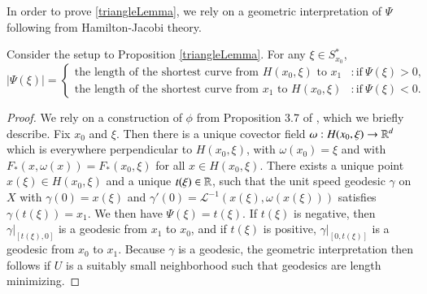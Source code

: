 

In order to prove \ref{triangleLemma}, we rely on a geometric interpretation of $\Psi$ following from Hamilton-Jacobi theory.

\begin{lemma} \label{HamiltonLemma}
    Consider the setup to Proposition \ref{triangleLemma}. For any $\xi \in S\!_{x_0}^*$,
    \[ |\Psi(\xi)| = \begin{cases} \text{the length of the shortest curve from $H(x_0,\xi)$ to $x_1$} & : \text{if}\ \Psi(\xi) > 0, \\ \text{the length of the shortest curve from $x_1$ to $H(x_0,\xi)$} & : \text{if}\ \Psi(\xi) < 0. \end{cases} \]
\end{lemma}
\begin{proof}
    We rely on a construction of $\phi$ from Proposition 3.7 of \cite{Treves2}, which we briefly describe. Fix $x_0$ and $\xi$. Then there is a unique covector field $\omega: H(x_0,\xi) \to \operatorname{\mathbb{R}}^d$ which is everywhere perpendicular to $H(x_0,\xi)$, with $\omega(x_0) = \xi$ and with $F_*(x,\omega(x)) = F_*(x_0,\xi)$ for all $x \in H(x_0,\xi)$. There exists a unique point $x(\xi) \in H(x_0,\xi)$ and a unique $t(\xi) \in \operatorname{\mathbb{R}}$, such that the unit speed geodesic $\gamma$ on $X$ with $\gamma(0) = x(\xi)$ and $\gamma'(0) = \mathcal{L}^{-1}( x(\xi), \omega(x(\xi)) )$ satisfies $\gamma( t(\xi) ) = x_1$. We then have $\Psi(\xi) = t(\xi)$. If $t(\xi)$ is negative, then $\gamma|_{[t(\xi),0]}$ is a geodesic from $x_1$ to $x_0$, and if $t(\xi)$ is positive, $\gamma|_{[0,t(\xi)]}$ is a geodesic from $x_0$ to $x_1$. Because $\gamma$ is a geodesic, the geometric interpretation then follows if $U$ is a suitably small neighborhood such that geodesics are length minimizing.
\end{proof}

